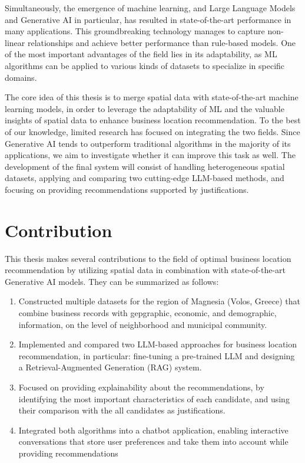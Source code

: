 Simultaneously, the emergence of machine learning, and Large Language Models and Generative AI in particular, has resulted in state-of-the-art performance in many applications. This groundbreaking technology manages to capture non-linear relationships and achieve better performance than rule-based models. One of the most important advantages of the field lies in its adaptability, as ML algorithms can be applied to various kinds of datasets to specialize in specific domains. 

The core idea of this thesis is to merge spatial data with state-of-the-art machine learning models, in order to leverage the adaptability of ML and the valuable insights of spatial data to enhance business location recommendation. To the best of our knowledge, limited research has focused on integrating the two fields. Since Generative AI tends to outperform traditional algorithms in the majority of its applications, we aim to investigate whether it can improve this task as well. The development of the final system will consist of handling heterogeneous spatial datasets, applying and comparing two cutting-edge LLM-based methods, and focusing on providing recommendations supported by justifications.



\section{Contribution}

This thesis makes several contributions to the field of optimal business location recommendation by utilizing spatial data in combination with state-of-the-art Generative AI models. They can be summarized as follows:

\begin{enumerate}
    \item Constructed multiple datasets for the region of Magnesia (Volos, Greece) that combine business records with gepgraphic, economic, and demographic, information, on the level of neighborhood and municipal community.
    \item Implemented and compared two LLM-based approaches for business location recommendation, in particular: fine-tuning a pre-trained LLM and designing a Retrieval-Augmented Generation (RAG) system.
    \item Focused on providing explainability about the recommendations, by identifying the most important characteristics of each candidate, and using their comparison with the all candidates as justifications. 
    \item Integrated both algorithms into a chatbot application, enabling interactive conversations that store user preferences and take them into account while providing recommendations
\end{enumerate}


